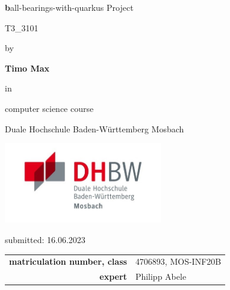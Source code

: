 \def\title{ball-bearings-with-quarkus Project}
\def\abgabe{16.06.2023}

\begin{titlepage}
	
	
	
	\vspace{5pt}
	
	\begin{center}
		
		\Large \textbf\title
		
		\vspace{50pt}
		
		\large T3\_3101
		
		by 
		
		\large \textbf{Timo Max} 
		
		\vspace{15pt}
		
		in 
		
		\large computer science course
		
		Duale Hochschule Baden-Württemberg Mosbach

        \vspace{10pt}

        \includegraphics[height=3.5cm]{images/dhbw-logo.jpg}
		
		\vspace{20pt}
		
		\large submitted: \abgabe
		
		\vspace{30pt}

		
		\begin{table}[h]
			\centering
			\begin{tabular}{r l}
				\large\textbf{matriculation number, class} & \large 4706893, MOS-INF20B \\
                \large\textbf{expert} & \large Philipp Abele \\
			\end{tabular}
			
		\end{table}
		
	\end{center}
	
	
\end{titlepage}